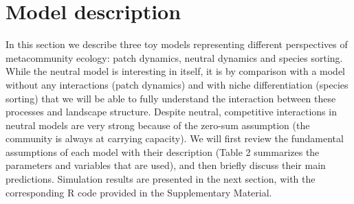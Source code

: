 \documentclass[12pt]{article}
\begin{document}
\section*{Model description}

In this section we describe three toy models representing different
perspectives of metacommunity ecology: patch dynamics, neutral dynamics and
species sorting. While the neutral model is interesting in itself, it is by
comparison with a model without any interactions (patch dynamics) and with niche
differentiation (species sorting) that we will be able to fully understand the
interaction between these processes and landscape structure. Despite neutral,
competitive interactions in neutral models are very strong because of the
zero-sum assumption (the community is always at carrying capacity). We will
first review the fundamental assumptions of each model with their description
(Table 2 summarizes the parameters and variables that are used), and then
briefly discuss their main predictions. Simulation results are presented in the
next section, with the corresponding R code provided in the Supplementary
Material.
\end{document}
